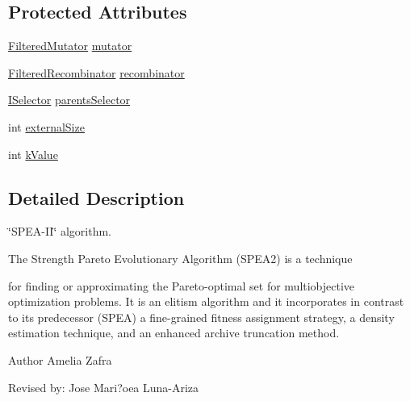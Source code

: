 \subsection*{Protected Attributes}
\begin{DoxyCompactItemize}
\item 
\hyperlink{classnet_1_1sf_1_1jclec_1_1base_1_1_filtered_mutator}{Filtered\-Mutator} \hyperlink{classnet_1_1sf_1_1jclec_1_1algorithm_1_1multiobjective_1_1_s_p_e_a2_a5618c231042f9299eeb4a05c28ee25e9}{mutator}
\item 
\hyperlink{classnet_1_1sf_1_1jclec_1_1base_1_1_filtered_recombinator}{Filtered\-Recombinator} \hyperlink{classnet_1_1sf_1_1jclec_1_1algorithm_1_1multiobjective_1_1_s_p_e_a2_abaabedd4c7063dc7943f6405dc126057}{recombinator}
\item 
\hyperlink{interfacenet_1_1sf_1_1jclec_1_1_i_selector}{I\-Selector} \hyperlink{classnet_1_1sf_1_1jclec_1_1algorithm_1_1multiobjective_1_1_s_p_e_a2_ae8da0f389d94013c1d11b0d277dff0a9}{parents\-Selector}
\item 
int \hyperlink{classnet_1_1sf_1_1jclec_1_1algorithm_1_1multiobjective_1_1_s_p_e_a2_a0e2715b1630c1863b6dbaf00e2c37f5e}{external\-Size}
\item 
int \hyperlink{classnet_1_1sf_1_1jclec_1_1algorithm_1_1multiobjective_1_1_s_p_e_a2_a31f4793e1cf92f269cdc6eedd71fd383}{k\-Value}
\end{DoxyCompactItemize}


\subsection{Detailed Description}
\char`\"{}\-S\-P\-E\-A-\/\-I\-I\char`\"{} algorithm. \begin{DoxyVerb}The Strength Pareto Evolutionary Algorithm (SPEA2) is a technique 
\end{DoxyVerb}
 for finding or approximating the Pareto-\/optimal set for multiobjective optimization problems. It is an elitism algorithm and it incorporates in contrast to its predecessor (S\-P\-E\-A) a fine-\/grained fitness assignment strategy, a density estimation technique, and an enhanced archive truncation method.

\begin{DoxyAuthor}{Author}
Amelia Zafra 

Revised by\-: Jose Mari?oea Luna-\/\-Ariza 
\end{DoxyAuthor}



